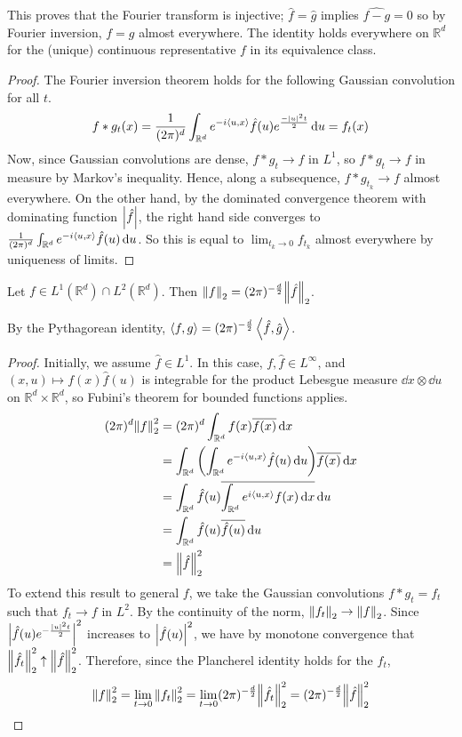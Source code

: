 \begin{remark}
	This proves that the Fourier transform is injective; \( \hat f = \hat g \) implies \( \widehat{f - g} = 0 \) so by Fourier inversion, \( f = g \) almost everywhere.
	The identity holds everywhere on \( \mathbb R^d \) for the (unique) continuous representative \( f \) in its equivalence class.
\end{remark}
\begin{proof}
	The Fourier inversion theorem holds for the following Gaussian convolution for all \( t \).
	\[ f \ast g_t(x) = \frac{1}{(2\pi)^d} \int_{\mathbb R^d} e^{-i\left\langle{u,x}\right\rangle} \hat f(u) e^{\frac{-\abs{u}^2 t}{2}} \dd{u} = f_t(x) \]
	Now, since Gaussian convolutions are dense, \( f \ast g_t \to f \) in \( L^1 \), so \( f \ast g_t \to f \) in measure by Markov's inequality.
	Hence, along a subsequence, \( f \ast g_{t_k} \to f \) almost everywhere.
	On the other hand, by the dominated convergence theorem with dominating function \( \abs{\hat f} \), the right hand side converges to \( \frac{1}{(2\pi)^d} \int_{\mathbb R^d} e^{-i\left\langle{u,x}\right\rangle} \hat f(u) \dd{u} \).
	So this is equal to \( \lim_{t_k \to 0} f_{t_k} \) almost everywhere by uniqueness of limits.
\end{proof}
\begin{theorem}[Plancherel]
	Let \( f \in L^1(\mathbb R^d) \cap L^2(\mathbb R^d) \).
	Then \( \norm{f}_2 = (2\pi)^{-\frac{d}{2}} \norm{\hat f}_2 \).
\end{theorem}
\begin{remark}
	By the Pythagorean identity, \( \left\langle{f, g}\right\rangle = (2\pi)^{-\frac{d}{2}} \left\langle{\hat f, \hat g}\right\rangle \).
\end{remark}
\begin{proof}
	Initially, we assume \( \hat f \in L^1 \).
	In this case, \( f, \hat f \in L^\infty \), and \( (x,u) \mapsto f(x)\hat f(u) \) is integrable for the product Lebesgue measure \( \dd{x} \otimes \dd{u} \) on \( \mathbb R^d \times \mathbb R^d \), so Fubini's theorem for bounded functions applies.
	\begin{align*}
		(2\pi)^d \norm{f}_2^2 &= (2\pi)^d \int_{\mathbb R^d} f(x) \overline{f(x)} \dd{x} \\
		&= \int_{\mathbb R^d} \qty(\int_{\mathbb R^d} e^{-i\left\langle{u,x}\right\rangle} \hat f(u) \dd{u}) \overline{f(x)} \dd{x} \\
		&= \int_{\mathbb R^d} \hat f(u) \overline{\int_{\mathbb R^d} e^{i\left\langle{u,x}\right\rangle} f(x) \dd{x}} \dd{u} \\
		&= \int_{\mathbb R^d} \hat f(u) \overline{\hat f(u)} \dd{u} \\
		&= \norm{\hat f}_2^2
	\end{align*}
	To extend this result to general \( f \), we take the Gaussian convolutions \( f \ast g_t = f_t \) such that \( f_t \to f \) in \( L^2 \).
	By the continuity of the norm, \( \norm{f_t}_2 \to \norm{f}_2 \).
	Since \( \abs{\hat f(u) e^{-\frac{\abs{u}^2 t}{2}}}^2 \) increases to \( \abs{\hat f(u)}^2 \), we have by monotone convergence that \( \norm{\hat f_t}_2^2 \uparrow \norm{\hat f}_2^2 \).
	Therefore, since the Plancherel identity holds for the \( f_t \),
	\[ \norm{f}_2^2 = \lim_{t \to 0} \norm{f_t}_2^2 = \lim_{t \to 0} (2\pi)^{-\frac{d}{2}} \norm{\hat f_t}_2^2 = (2\pi)^{-\frac{d}{2}} \norm{\hat f}_2^2 \]
\end{proof}
